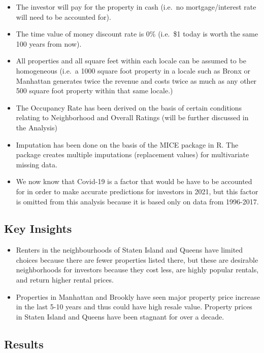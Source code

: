 \documentclass[
]{article}
\providecommand{\tightlist}{%
  \setlength{\itemsep}{0pt}\setlength{\parskip}{0pt}}
\begin{document}
\begin{itemize}
\tightlist
\item
  The investor will pay for the property in cash (i.e.~no
  mortgage/interest rate will need to be accounted for).
\item
  The time value of money discount rate is 0\% (i.e.~\$1 today is worth
  the same 100 years from now).
\item
  All properties and all square feet within each locale can be assumed
  to be homogeneous (i.e.~a 1000 square foot property in a locale such
  as Bronx or Manhattan generates twice the revenue and costs twice as
  much as any other 500 square foot property within that same locale.)
\item
  The Occupancy Rate has been derived on the basis of certain conditions
  relating to Neighborhood and Overall Ratings (will be further
  discussed in the Analysis)
\item
  Imputation has been done on the basis of the MICE package in R. The
  package creates multiple imputations (replacement values) for
  multivariate missing data.
\item
  We now know that Covid-19 is a factor that would be have to be
  accounted for in order to make accurate predictions for investors in
  2021, but this factor is omitted from this analysis because it is
  based only on data from 1996-2017.
\end{itemize}

\hypertarget{key-insights}{%
\subsection{Key Insights}\label{key-insights}}

\begin{itemize}
\tightlist
\item
  Renters in the neighbourhoods of Staten Island and Queens have limited
  choices because there are fewer properties listed there, but these are
  desirable neighborhoods for investors because they cost less, are
  highly popular rentals, and return higher rental prices.
\item
  Properties in Manhattan and Brookly have seen major property price
  increase in the last 5-10 years and thus could have high resale value.
  Property prices in Staten Island and Queens have been stagnant for
  over a decade.
\end{itemize}

\hypertarget{results}{%
\subsection{Results}\label{results}}
\end{document}
